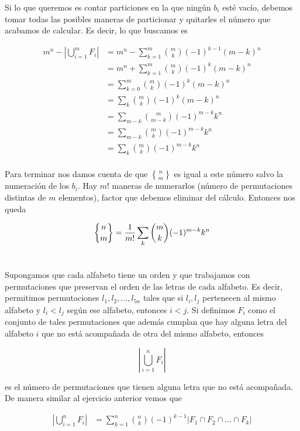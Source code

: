 \documentclass{article}
\newcommand{\stirlingD}[2]{\genfrac{\{}{\}}{0pt}{}{#1}{#2}}
\begin{document}
Si lo que queremos es contar particiones en la que ningún $b_i$ esté
vacío, debemos tomar todas las posibles maneras de particionar y quitarles el
número que acabamos de calcular. Es decir, lo que buscamos es

\begin{align*}
m^n - \left| \bigcup_{i=1}^m F_i \right|
  & = m^n - \sum_{k=1}^m \binom{m}{k} (-1)^{k-1} (m-k)^n \\
  & = m^n + \sum_{k=1}^m \binom{m}{k} (-1)^{k} (m-k)^n \\
  & = \sum_{k=0}^m \binom{m}{k} (-1)^{k} (m-k)^n \\
  & = \sum_k \binom{m}{k} (-1)^{k} (m-k)^n \\
  & = \sum_{m-k} \binom{m}{m-k} (-1)^{m-k} k^n \\
  & = \sum_{m-k} \binom{m}{k} (-1)^{m-k} k^n \\
  & = \sum_k \binom{m}{k} (-1)^{m-k} k^n \\
\end{align*}

Para terminar nos damos cuenta de que $\stirlingD{n}{m}$ es igual a este
número salvo la numeración de los $b_i$. Hay $m!$ maneras de numerarlos
(número de permutaciones distintas de $m$ elementos), factor que
debemos eliminar del cálculo. Entonces nos queda

\[
\stirlingD{n}{m} = \frac{1}{m!} \sum_k \binom{m}{k} (-1)^{m-k} k^n \\
\]

\section{}

Supongamos que cada alfabeto tiene un orden y que trabajamos con permutaciones
que preservan el orden de las letras de cada alfabeto. Es decir, permitimos
permutaciones $l_1, l_2, \ldots, l_{5n}$ tales que si $l_i, l_j$ pertenecen
al mismo alfabeto y $l_i < l_j$ según ese alfabeto, entonces $i < j$.
Si definimos $F_i$ como el conjunto de tales permutaciones que además cumplan
que hay alguna letra del alfabeto $i$ que no está acompañada de otra del mismo
alfabeto, entonces

\[ \left| \bigcup_{i=1}^n F_i \right| \]

es el número de permutaciones que tienen alguna letra que no está acompañada. De
manera similar al ejercicio anterior vemos que

\begin{align*}
\left| \bigcup_{i=1}^n F_i \right| & = \sum_{k=1}^n \binom{n}{k} (-1)^{k-1} |F_1 \cap F_2 \cap \ldots \cap F_k|
\end{align*}
\end{document}
